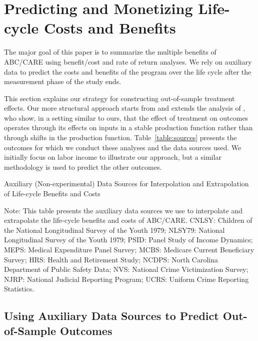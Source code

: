\section{Predicting and Monetizing Life-cycle Costs and Benefits}\label{section:cbamethodology}

The major goal of this paper is to summarize the multiple benefits of ABC/CARE using benefit/cost and rate of return analyses. We rely on auxiliary data to predict the costs and benefits of the program over the life cycle after the measurement phase of the study ends.

This section explains our strategy for constructing out-of-sample treatment effects. Our more structural approach starts from and extends the analysis of \citet{Heckman_Pinto_etal_2013_PerryFactor}, who show, in a setting similar to ours, that the effect of treatment on outcomes operates through its effects on inputs in a stable production function rather than through shifts in the production function. Table~\ref{table:sources} presents the outcomes for which we conduct these analyses and the data sources used. We initially focus on labor income to illustrate our approach, but a similar methodology is used to predict the other outcomes.

\begin{table}[!htbp]
\begin{threeparttable}
\caption{Auxiliary (Non-experimental) Data Sources for Interpolation and Extrapolation of Life-cycle Benefits and Costs} \label{table:sources}
\footnotesize

\begin{tablenotes}
\footnotesize
Note: This table presents the auxiliary data sources we use to interpolate and extrapolate the life-cycle benefits and costs of ABC/CARE. CNLSY: Children of the National Longitudinal Survey of the Youth 1979; NLSY79: National Longitudinal Survey of the Youth 1979; PSID: Panel Study of Income Dynamics; MEPS: Medical Expenditure Panel Survey; MCBS: Medicare Current Beneficiary Survey; HRS: Health and Retirement Study; NCDPS: North Carolina Department of Public Safety Data; NVS: National Crime Victimization Survey; NJRP: National Judicial Reporting Program; UCRS: Uniform Crime Reporting Statistics.
\end{tablenotes}
\end{threeparttable}
\end{table}


\subsection{Using Auxiliary Data Sources to Predict Out-of-Sample Outcomes}\label{sec:usingaux}

